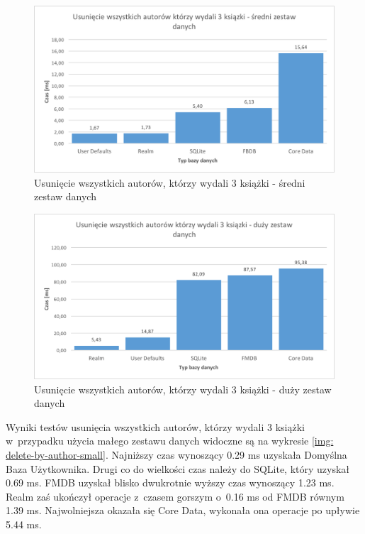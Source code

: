 \begin{figure}[H]
    \centering\includegraphics[width=\linewidth]{img/delete_data/delete_by_author/delete_by_author_medium_test.png}
    \caption{Usunięcie wszystkich autorów, którzy wydali 3 książki - średni zestaw danych}
    \label{img: delete-by-author-medium}
\end{figure}

\begin{figure}[H]
    \centering\includegraphics[width=\linewidth]{img/delete_data/delete_by_author/delete_by_author_big_test.png}
    \caption{Usunięcie wszystkich autorów, którzy wydali 3 książki - duży zestaw danych}
    \label{img: delete-by-author-big}
\end{figure}

Wyniki testów usunięcia wszystkich autorów, którzy wydali 3 książki w~przypadku użycia małego zestawu danych widoczne są na wykresie \ref{img: delete-by-author-small}.  Najniższy czas wynoszący 0.29 ms uzyskała Domyślna Baza Użytkownika. Drugi co do wielkości czas należy do SQLite, który uzyskał 0.69 ms. FMDB uzyskał blisko dwukrotnie wyższy czas wynoszący 1.23 ms. Realm zaś ukończył operacje z~czasem gorszym o~0.16 ms od FMDB równym 1.39 ms. Najwolniejsza okazała się Core Data, wykonała ona operacje po upływie 5.44 ms. 

